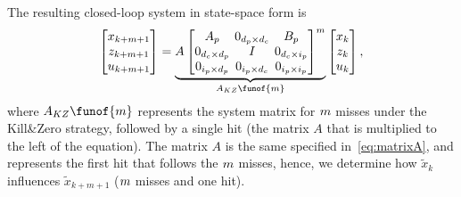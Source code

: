 The resulting closed-loop system in state-space form is
%
\begin{equation} 
    \setlength\arraycolsep{2pt}
    \label{eq:KZ}
    \begin{bmatrix}
        x_{k+\nummisses+1} \\
        z_{k+\nummisses+1} \\
        u_{k+\nummisses+1}
    \end{bmatrix} = 
    \underbrace{ A \begin{bmatrix}
        A_p                                         & 0_{\numstatesplant \times \numstatesctl}  & B_p \\
        0_{\numstatesctl \times \numstatesplant}    & I                                         & 0_{\numstatesctl \times \numinputplant} \\
        0_{\numinputplant \times \numstatesplant}   & 0_{\numinputplant \times \numstatesctl}   & 0_{\numinputplant \times \numinputplant}
    \end{bmatrix}^{\nummisses}}_{A_{KZ}\funof{\nummisses}}
    \begin{bmatrix}
        x_{k} \\
        z_{k} \\
        u_{k}
    \end{bmatrix},
\end{equation}
%
where $A_{KZ}\funof{\nummisses}$ represents the system matrix for $m$ misses under the Kill\&Zero strategy, followed by a single hit (the matrix $A$ that is multiplied to the left of the equation).
The matrix $A$ is the same specified in~\eqref{eq:matrixA}, and represents the first hit that follows the $m$ misses, hence, we determine how $\tilde{x}_k$ influences $\tilde{x}_{k+m+1}$ ($m$ misses and one hit).

